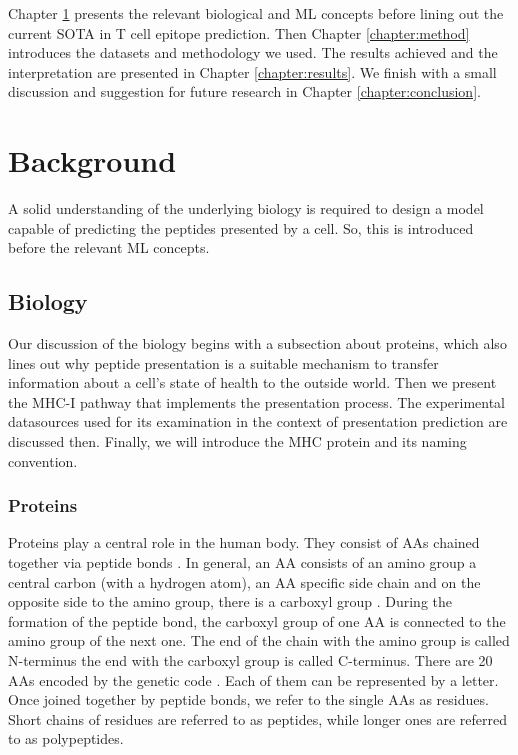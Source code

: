 \documentclass[msc,deptreport,ai]{infthesis} %
\begin{document}
Chapter \ref{chapter:background} presents the relevant biological and \gls{ML} concepts before lining out the current \gls{SOTA} in T cell epitope prediction. Then Chapter \ref{chapter:method} introduces the datasets and methodology we used. The results achieved and the interpretation are presented in Chapter \ref{chapter:results}. We finish with a small discussion and suggestion for future research in Chapter \ref{chapter:conclusion}.


\chapter{Background}
\label{chapter:background}

	A solid understanding of the underlying biology is required to design a model capable of predicting the peptides presented by a cell. So, this is introduced before the relevant \gls{ML} concepts.

\section{Biology}
\label{sec:biology}
	Our discussion of the biology begins with a subsection about proteins, which also lines out why peptide presentation is a suitable mechanism to transfer information about a cell's state of health to the outside world. Then we present the \gls{MHC-I} pathway that implements the presentation process. The experimental datasources used for its examination in the context of presentation prediction are discussed then. Finally, we will introduce the \gls{MHC} protein and its naming convention.

	\subsection{Proteins}
	\label{subsec:bg_biology_proteins}

		Proteins play a central role in the human body. They consist of \glspl{AA} chained together via peptide bonds \cite{pollard_cell_2016}. In general, an \gls{AA} consists of an amino group a central carbon (with a hydrogen atom), an \gls{AA} specific side chain and on the opposite side to the amino group, there is a carboxyl group \cite{crowe_chemistry_2014}. During the formation of the peptide bond, the carboxyl group  of one \gls{AA} is connected to the amino group of the next one. The end of the chain with the amino group is called N-terminus the end with the carboxyl group is called C-terminus. There are 20 \glspl{AA} encoded by the genetic code \cite{pollard_cell_2016}. Each of them can be represented by a letter. Once joined together by peptide bonds, we refer to the single \glspl{AA} as residues. Short chains of residues are referred to as peptides, while longer ones are referred to as polypeptides.
		
\end{document}
